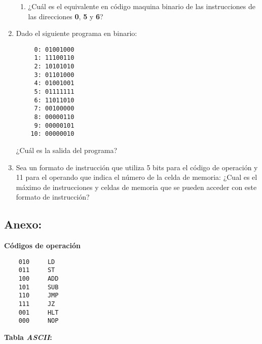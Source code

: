 \documentclass[12pt]{article}
\begin{document}
\begin{enumerate}
\begin{enumerate}
            \item ¿Cuál es el equivalente en código maquina binario de las
                instrucciones de las direcciones \textbf{0}, \textbf{5} y
                \textbf{6}?

        \end{enumerate}

    \item Dado el siguiente programa en binario:

        \begin{verbatim}
     0: 01001000
     1: 11100110
     2: 10101010
     3: 01101000
     4: 01001001
     5: 01111111
     6: 11011010
     7: 00100000
     8: 00000110
     9: 00000101
    10: 00000010
        \end{verbatim}

        ¿Cuál es la salida del programa?

    \item Sea un formato de instrucción que utiliza 5 bits para el código de
        operación y 11 para el operando que indica el número de la celda de
        memoria: ¿Cual es el máximo de instrucciones y celdas de memoria que
        se pueden acceder con este formato de instrucción?

\end{enumerate}

\subsection*{ \large\textbf{Anexo:} }

\textbf{Códigos de operación}

\begin{verbatim}
    010     LD
    011     ST
    100     ADD
    101     SUB
    110     JMP
    111     JZ
    001     HLT
    000     NOP
\end{verbatim}

\textbf{Tabla \emph{ASCII}:}
\end{document}
